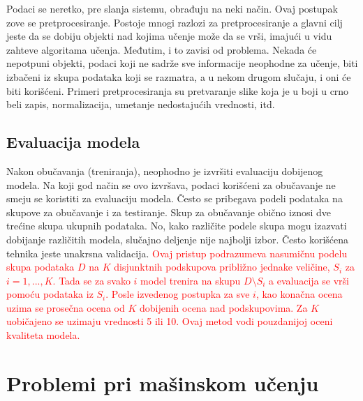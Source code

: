 Podaci se neretko, pre slanja sistemu, obrađuju na neki način. Ovaj postupak zove se pretprocesiranje. Postoje mnogi razlozi za pretprocesiranje a glavni cilj jeste da se dobiju objekti nad kojima učenje može da se vrši, imajući u vidu zahteve algoritama učenja. Međutim, i to zavisi od problema. Nekada će nepotpuni objekti, podaci koji ne sadrže sve informacije neophodne za učenje, biti izbačeni iz skupa podataka koji se razmatra, a u nekom drugom slučaju, i oni će biti korišćeni. Primeri pretprocesiranja su pretvaranje slike koja je u boji u crno beli zapis, normalizacija, umetanje nedostajućih vrednosti, itd.

\subsection{Evaluacija modela}

Nakon obučavanja (treniranja), neophodno je izvršiti evaluaciju dobijenog modela. Na koji god način se ovo izvršava, podaci korišćeni za obučavanje ne smeju se koristiti za evaluaciju modela. Često se pribegava podeli podataka na skupove za obučavanje i za testiranje. Skup za obučavanje obično iznosi dve trećine skupa ukupnih podataka. No, kako različite podele skupa mogu izazvati dobijanje različitih modela, slučajno deljenje nije najbolji izbor.  Često korišćena tehnika jeste unakrsna validacija. \textcolor{red}{Ovaj pristup podrazumeva nasumičnu podelu skupa podataka $D$ na $K$ disjunktnih podskupova približno jednake veličine, $S_i$ za $i=1,...,K$. Tada se za svako $i$ model trenira na skupu $D \setminus S_i$ a evaluacija se vrši pomoću podataka iz $S_i$. Posle izvedenog postupka za sve $i$, kao konačna ocena uzima se prosečna ocena od $K$ dobijenih ocena nad podskupovima. Za $K$ uobičajeno se uzimaju vrednosti 5 ili 10. Ovaj metod vodi pouzdanijoj oceni kvaliteta modela.}

\section{Problemi pri mašinskom učenju}


